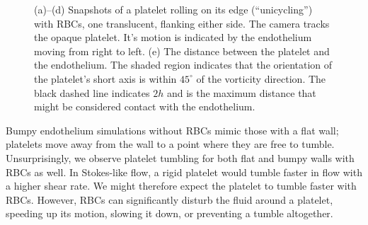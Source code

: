 \begin{figure}[th!]
    \vspace{11pt}

    \begin{subfigure}[t]{\textwidth}
    \end{subfigure}
    \caption[Platelet unicycling behavior]{%
(a)--(d) Snapshots of a platelet rolling on its edge (``unicycling'') with RBCs, one
translucent, flanking either side. The camera tracks the opaque platelet. It's motion is
indicated by the endothelium moving from right to left. (e) The distance between
the platelet and the endothelium. The shaded region indicates that the orientation of the
platelet's short axis is within $45^\circ$ of the vorticity direction.  The black dashed
line indicates $2h$ and is the maximum distance that might be considered contact with the
endothelium.
    }\label{fig:unicycle}
\end{figure}

Bumpy endothelium simulations without RBCs mimic those with a flat wall; platelets move
away from the wall to a point where they are free to tumble. Unsurprisingly, we observe
platelet tumbling for both flat and bumpy walls with RBCs as well. In Stokes-like flow, a
rigid platelet would tumble faster in flow with a higher shear rate. We might therefore
expect the platelet to tumble faster with RBCs. However, RBCs can significantly disturb
the fluid around a platelet, speeding up its motion, slowing it down, or preventing a
tumble altogether.

